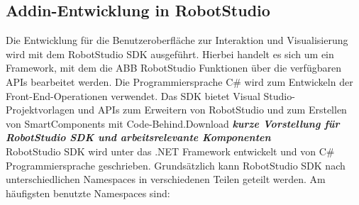 \documentclass[14pt,a4paper,titlepage]{article}
\begin{document}
		\subsection{Addin-Entwicklung in RobotStudio}
			Die Entwicklung für die Benutzeroberfläche zur Interaktion und Visualisierung wird mit dem RobotStudio SDK ausgeführt. Hierbei handelt es sich um ein Framework, mit dem die ABB RobotStudio Funktionen über die verfügbaren APIs bearbeitet werden. Die Programmiersprache C\# wird zum Entwickeln der Front-End-Operationen verwendet. 
			Das SDK bietet Visual Studio-Projektvorlagen und APIs zum Erweitern von RobotStudio und zum Erstellen von SmartComponents mit Code-Behind.Download
			\bigbreak
			\textbf{\emph{kurze Vorstellung für RobotStudio SDK und arbeitsrelevante Komponenten}}
			\\
			RobotStudio SDK wird unter das .NET Framework entwickelt und von C\# Programmiersprache geschrieben.  Grundsätzlich kann RobotStudio SDK nach unterschiedlichen Namespaces in verschiedenen Teilen geteilt werden. Am häufigsten benutzte Namespaces sind:
\end{document}

